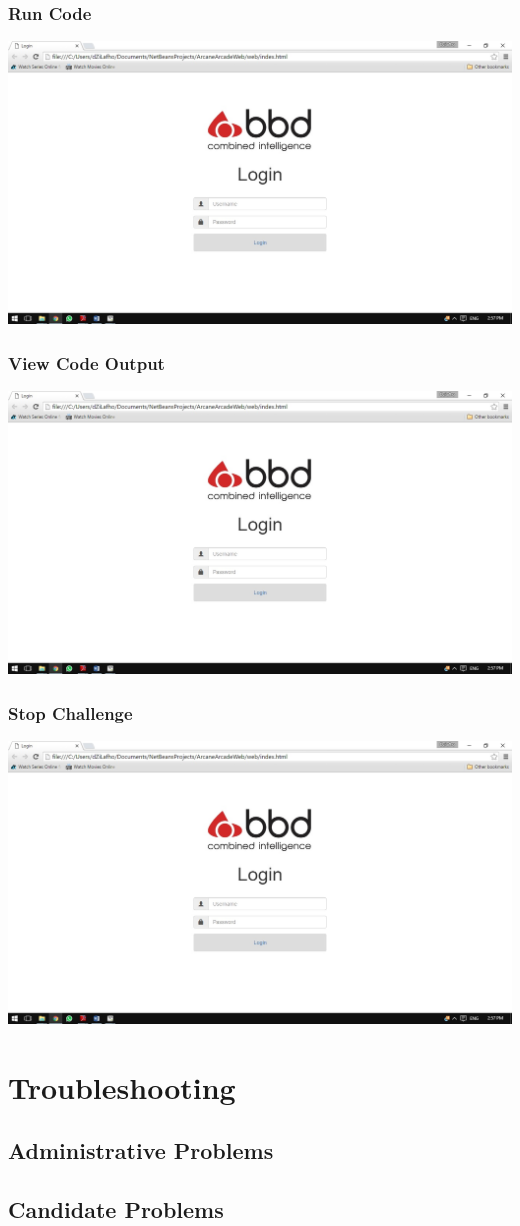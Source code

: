 \documentclass[english]{article}
\begin{document}
			\subsubsection{Run Code}
				\includegraphics[width=\linewidth]{Login.jpg}
			\subsubsection{View Code Output}
				\includegraphics[width=\linewidth]{Login.jpg}
			\subsubsection{Stop Challenge}
				\includegraphics[width=\linewidth]{Login.jpg}
			
	\section{Troubleshooting}
		\subsection{Administrative Problems}
		\subsection{Candidate Problems}
		
\end{document}
